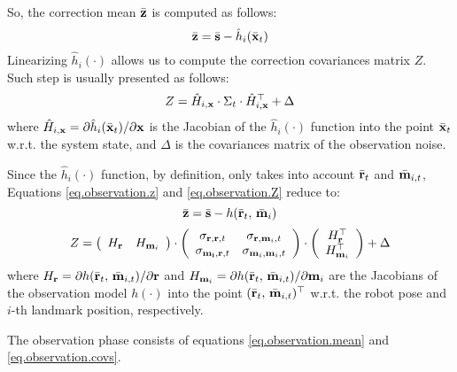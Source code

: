 	So, the correction mean $\bar{\boldsymbol{\mathrm{{z}}}}$ is computed as follows:
	\begin{equation}
		\label{eq.observation.z}
		\bvect{z} = \bvect{s} - \hat{h}_i(\bvect{x}_t) %
	\end{equation}
	Linearizing $\hat{h}_i(\cdot)$ allows us to compute the correction covariances matrix $Z$. Such step is usually presented as follows:
	\begin{equation}
		\label{eq.observation.Z}
		Z = \hat{H}_{i,\boldsymbol{\mathrm{{x}}}} \cdot \Sigma_t \cdot \hat{H}^\top_{i,\boldsymbol{\mathrm{{x}}}} + \Delta
	\end{equation}
	where $\hat{H}_{i,\boldsymbol{\mathrm{{x}}}} = \partial \hat{h}_i(\bar{\boldsymbol{\mathrm{{x}}}}_{t}) / \partial \boldsymbol{\mathrm{{x}}}$ is the Jacobian of the $\hat{h}_i(\cdot)$ function into the point $\bar{\boldsymbol{\mathrm{{x}}}}_{t}$ w.r.t. the system state, and $\Delta$ is the covariances matrix of the observation noise.
	
	Since the $\hat{h}_i(\cdot)$ function, by definition, only takes into account $\bar{\boldsymbol{\mathrm{{r}}}}_t$ and $\bar{\boldsymbol{\mathrm{{m}}}}_{i,t}$, Equations \ref{eq.observation.z} and \ref{eq.observation.Z} reduce to:
	\begin{equation}
		\label{eq.observation.mean}
		\bar{\boldsymbol{\mathrm{{z}}}} = \bar{\boldsymbol{\mathrm{{s}}}} - h(\bar{\boldsymbol{\mathrm{{r}}}}_t,\, \bar{\boldsymbol{\mathrm{{m}}}}_i)
	\end{equation}
	\begin{equation}
		\label{eq.observation.covs}
		Z = 
		\left(\begin{array}{cc}
			H_{\boldsymbol{\mathrm{{r}}}} & H_{\boldsymbol{\mathrm{{m}}}_i}
		\end{array}\right)
		\cdot
		\left(\begin{array}{cc}
			\sigma_{\boldsymbol{\mathrm{{r}}}, \boldsymbol{\mathrm{{r}}}, t} & \sigma_{\boldsymbol{\mathrm{{r}}}, \boldsymbol{\mathrm{{m}}}_i, t} \\
			\sigma_{\boldsymbol{\mathrm{{m_i}}}, \boldsymbol{\mathrm{{r}}}, t} & \sigma_{\boldsymbol{\mathrm{{m}}}_i, \boldsymbol{\mathrm{{m}}}_i, t}
		\end{array}\right)
		\cdot
		\left(\begin{array}{c}
			H^\top_{\boldsymbol{\mathrm{{r}}}} \\ H^\top_{\boldsymbol{\mathrm{{m}}}_i}
		\end{array}\right)
		+ \Delta
	\end{equation}
	where $H_{\boldsymbol{\mathrm{{r}}}} = \partial h(\bar{\boldsymbol{\mathrm{{r}}}}_{t},\, \bar{\boldsymbol{\mathrm{{m}}}}_{i,t}) / \partial \boldsymbol{\mathrm{{r}}}$ and $H_{\boldsymbol{\mathrm{{m}}}_i} = \partial h(\bar{\boldsymbol{\mathrm{{r}}}}_{t},\, \bar{\boldsymbol{\mathrm{{m}}}}_{i,t}) / \partial \boldsymbol{\mathrm{{m}}}_i$ are the Jacobians of the observation model $h(\cdot)$ into the point $(\bar{\boldsymbol{\mathrm{{r}}}}_{t},\, \bar{\boldsymbol{\mathrm{{m}}}}_{i,t})^\top$ w.r.t. the robot pose and $i$-th landmark position, respectively.
	
	\begin{recap}
		The observation phase consists of equations \ref{eq.observation.mean} and \ref{eq.observation.covs}.
	\end{recap}
	